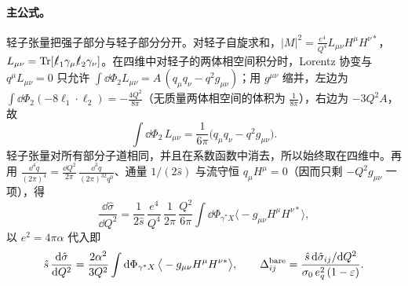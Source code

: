 \paragraph{主公式。}轻子张量把强子部分与轻子部分分开。对轻子自旋求和，$|M|^2=\frac{e^4}{Q^4}L_{\mu\nu}H^\mu H^{\nu*}$，$L_{\mu\nu}=\operatorname{Tr}[\slashed{\ell}_1\gamma_\mu\slashed{\ell}_2\gamma_\nu]$。在四维中对轻子的两体相空间积分时，Lorentz 协变与 $q^\mu L_{\mu\nu}=0$ 只允许 $\int\dd\Phi_2L_{\mu\nu}=A\,(q_\mu q_\nu-q^2g_{\mu\nu})$；用 $g^{\mu\nu}$ 缩并，左边为 $\int\dd\Phi_2(-8\ell_1\cdot\ell_2)=-\frac{4Q^2}{8\pi}$（无质量两体相空间的体积为 $\frac1{8\pi}$），右边为 $-3Q^2A$，故
\begin{equation}\label{eq:dy-leptontensor}
\int\dd\Phi_2\,L_{\mu\nu}=\frac{1}{6\pi}\big(q_\mu q_\nu-q^2g_{\mu\nu}\big).
\end{equation}
轻子张量对所有部分子道相同，并且在系数函数中消去，所以始终取在四维中。再用 $\frac{\dd^4q}{(2\pi)^4}=\frac{\dd Q^2}{2\pi}\,\frac{\dd^3q}{(2\pi)^32q^0}$、通量 $1/(2\hat s)$ 与流守恒 $q_\mu H^\mu=0$（因而只剩 $-Q^2g_{\mu\nu}$ 一项），得
\[
\frac{\dd\hat\sigma}{\dd Q^2}=\frac{1}{2\hat s}\,\frac{e^4}{Q^4}\,\frac{1}{2\pi}\,\frac{Q^2}{6\pi}\int\dd\Phi_{\gamma^*X}\big\langle-g_{\mu\nu}H^\mu H^{\nu*}\big\rangle ,
\]
以 $e^2=4\pi\alpha$ 代入即
\begin{equation}\label{eq:dy-master}
\hat s\,\frac{\mathrm{d}\hat\sigma}{\mathrm{d} Q^2}=\frac{2\alpha^2}{3Q^2}\int\mathrm{d}\Phi_{\gamma^*X}\,\big\langle-g_{\mu\nu}H^\mu H^{\nu*}\big\rangle ,\qquad
\Delta^{\rm bare}_{ij}=\frac{\hat s\,\mathrm{d}\hat\sigma_{ij}/\mathrm{d} Q^2}{\sigma_0\,e_q^2\,(1-\varepsilon)} .
\end{equation}

